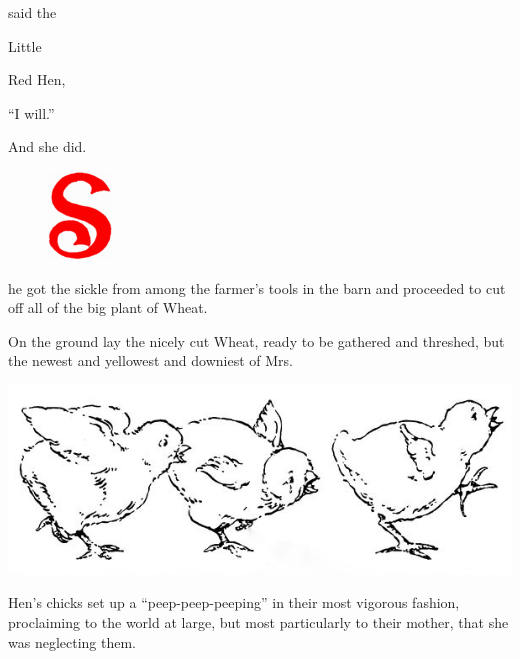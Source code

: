 \documentclass[letterpaper, 10pt, openany]{memoir}
\begin{document}
said the

\vspace{\onelineskip}

Little

\vspace{\onelineskip}

Red Hen,

\vspace{\onelineskip}

``I will.''

\vspace{\onelineskip}

And she did.

\newpage
\begin{figure}
	\includegraphics[width=0.15\textwidth]{image_017_1.jpg}
\end{figure}

he got the sickle from among the farmer's tools in the barn and proceeded to cut off all
of the big plant of Wheat.

\vspace{\onelineskip}

On the ground lay the nicely cut Wheat, ready to be gathered and threshed, but the newest
and yellowest and downiest of Mrs.

\begin{center}
	\includegraphics[width=\textwidth]{image_018_2.jpg}
\end{center}

Hen's chicks set up a “peep-peep-peeping” in their most vigorous fashion, proclaiming to the
world at large, but most particularly to their mother, that she was neglecting them.
\end{document}
